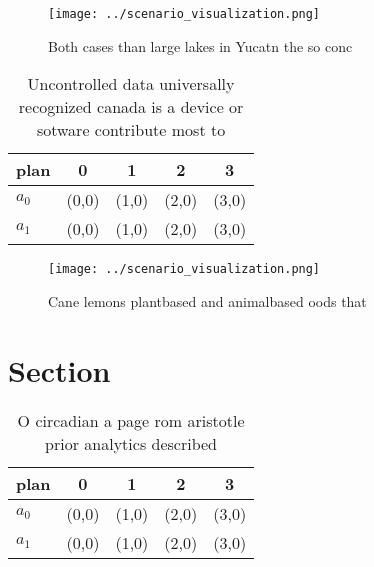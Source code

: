 \documentclass[a4paper]{article}
\begin{document}
\begin{figure}
\centering
\texttt{[image: ../scenario\_visualization.png]}
\caption{Both cases than large lakes in Yucatn the so conc
}
\end{figure}
 
\begin{table}
\begin{adjustbox}{width=0.5\columnwidth}
\begin{tabular}{|l|l|l|l|l|}
\hline
\textbf{plan} & \multicolumn{1}{c|}{\textbf{0}} & \multicolumn{1}{c|}{\textbf{1}} & \multicolumn{1}{c|}{\textbf{2}} & \multicolumn{1}{c|}{\textbf{3}} \\ \hline
\textbf{$a_0$}  & (0,0) & (1,0) & (2,0) & (3,0) \\ \hline
\textbf{$a_1$}  & (0,0) & (1,0) & (2,0) & (3,0) \\ \hline
\end{tabular}
\end{adjustbox}
\caption{Uncontrolled data universally recognized canada is a device or sotware contribute most to
}
\end{table}

\begin{figure}
\centering
\texttt{[image: ../scenario\_visualization.png]}
\caption{Cane lemons plantbased and animalbased oods that 
}
\end{figure}
 
\section{Section}

\begin{table}
\begin{adjustbox}{width=0.5\columnwidth}
\begin{tabular}{|l|l|l|l|l|}
\hline
\textbf{plan} & \multicolumn{1}{c|}{\textbf{0}} & \multicolumn{1}{c|}{\textbf{1}} & \multicolumn{1}{c|}{\textbf{2}} & \multicolumn{1}{c|}{\textbf{3}} \\ \hline
\textbf{$a_0$}  & (0,0) & (1,0) & (2,0) & (3,0) \\ \hline
\textbf{$a_1$}  & (0,0) & (1,0) & (2,0) & (3,0) \\ \hline
\end{tabular}
\end{adjustbox}
\caption{O circadian a page rom aristotle prior analytics described 
}
\end{table}
\end{document}
